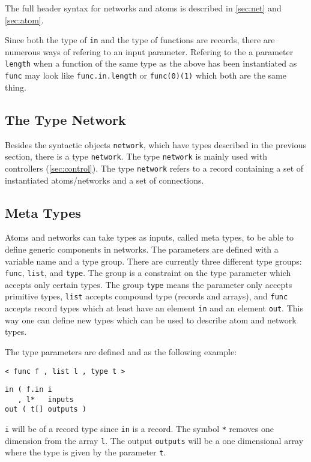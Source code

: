 The full header syntax for networks and atoms is described in
\autoref{sec:net} and \autoref{sec:atom}.

Since both the type of \verb#in# and the type of functions are
records, there are numerous ways of refering to an input
parameter. Refering to the a parameter \verb#length# when a function
of the same type as the above has been instantiated as \verb#func# may
look like \verb#func.in.length# or \verb#func(0)(1)# which both are
the same thing.

\subsection{The Type Network}
Besides the syntactic objects \verb#network#, which have types
described in the previous section, there is a type \verb#network#. The
type \verb#network# is mainly used with controllers
(\autoref{sec:control}). The type \verb#network# refers to a record
containing a set of instantiated atoms/networks and a set of
connections. 

\subsection{Meta Types}\label{sec:meta}
Atoms and networks can take types as inputs, called meta types, to be
able to define generic components in networks. The parameters are
defined with a variable name and a type group. There are currently
three different type groups: \verb#func#, \verb#list#, and
\verb#type#. The group is a constraint on the type parameter which
accepts only certain types. The group \verb#type# means the parameter
only accepts primitive types, \verb#list# accepts compound type
(records and arrays), and \verb#func# accepts record types which at
least have an element \verb#in# and an element \verb#out#. This way
one can define new types which can be used to describe atom and
network types.

The type parameters are defined and as the following example:

\begin{verbatim}
< func f , list l , type t >
\end{verbatim}

\begin{verbatim}
in ( f.in i
   , l*   inputs
out ( t[] outputs )
\end{verbatim}

\verb#i# will be of a record type since \verb#in# is a record. The
symbol \verb#*# removes one dimension from the array \verb#l#. The
output \verb#outputs# will be a one dimensional array where the type
is given by the parameter \verb#t#.

